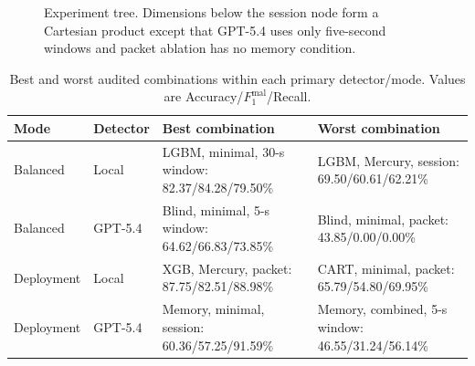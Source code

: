 \documentclass[letterpaper,twocolumn,10pt]{article}
\begin{document}
\begin{figure}[t]
\centering
{}
\caption{Experiment tree. Dimensions below the session node form a Cartesian product except that GPT-5.4 uses only five-second windows and packet ablation has no memory condition.}
\label{fig:experiment-tree}
\end{figure}

\begin{table}[t]
\centering
\caption{Best and worst audited combinations within each primary detector/mode. Values are Accuracy/$F_1^{\mathrm{mal}}$/Recall.}
\label{tab:best-worst}
\footnotesize
\begin{tabularx}{\textwidth}{llX X}
\toprule
Mode & Detector & Best combination & Worst combination \\
\midrule
Balanced & Local & LGBM, minimal, 30-s window: 82.37/84.28/79.50\% & LGBM, Mercury, session: 69.50/60.61/62.21\% \\
Balanced & GPT-5.4 & Blind, minimal, 5-s window: 64.62/66.83/73.85\% & Blind, minimal, packet: 43.85/0.00/0.00\% \\
Deployment & Local & XGB, Mercury, packet: 87.75/82.51/88.98\% & CART, minimal, packet: 65.79/54.80/69.95\% \\
Deployment & GPT-5.4 & Memory, minimal, session: 60.36/57.25/91.59\% & Memory, combined, 5-s window: 46.55/31.24/56.14\% \\
\bottomrule
\end{tabularx}
\end{table}
\end{document}
